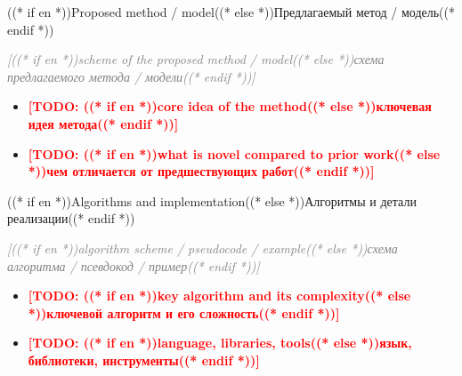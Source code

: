 \documentclass[aspectratio=169, 14pt]{beamer}
\newcommand{\todo}[1]{\textcolor{red}{\textbf{[TODO: #1]}}}
\begin{document}
\begin{frame}{((* if en *))Proposed method / model((* else *))Предлагаемый метод / модель((* endif *))}
  \begin{center}
    \textcolor{gray}{\itshape [((* if en *))scheme of the proposed method / model((* else *))схема предлагаемого метода / модели((* endif *))]}
  \end{center}

  \vspace{0.3em}
  \begin{itemize}
    \item \todo{((* if en *))core idea of the method((* else *))ключевая идея метода((* endif *))}
    \item \todo{((* if en *))what is novel compared to prior work((* else *))чем отличается от предшествующих работ((* endif *))}
  \end{itemize}
\end{frame}

\begin{frame}{((* if en *))Algorithms and implementation((* else *))Алгоритмы и детали реализации((* endif *))}
  \begin{center}
    \textcolor{gray}{\itshape [((* if en *))algorithm scheme / pseudocode / example((* else *))схема алгоритма / псевдокод / пример((* endif *))]}
  \end{center}

  \vspace{0.3em}
  \begin{itemize}
    \item \todo{((* if en *))key algorithm and its complexity((* else *))ключевой алгоритм и его сложность((* endif *))}
    \item \todo{((* if en *))language, libraries, tools((* else *))язык, библиотеки, инструменты((* endif *))}
  \end{itemize}
\end{frame}
\end{document}
